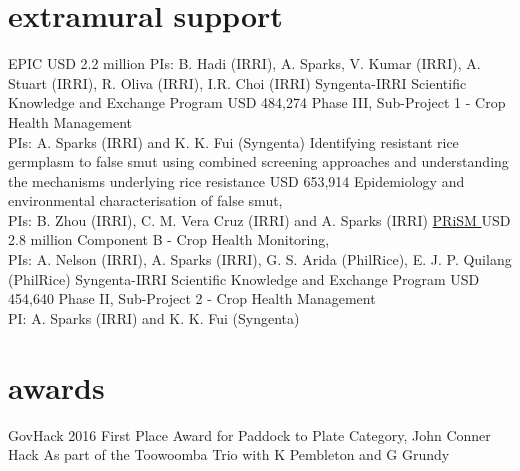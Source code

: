 \section*{extramural support}
  \begin{entrylist}
  {EPIC }
  {USD 2.2 million}
  {PIs: B. Hadi (IRRI), A. Sparks, V. Kumar (IRRI), A. Stuart (IRRI), R. Oliva (IRRI), I.R. Choi (IRRI)}
	 {Syngenta-IRRI Scientific Knowledge and Exchange Program}
	 {USD 484,274}
	 {Phase III, Sub-Project 1 - Crop Health Management\\PIs: A. Sparks (IRRI) and K. K. Fui (Syngenta)}
   {Identifying resistant rice germplasm to false smut using combined screening approaches and understanding the mechanisms underlying rice resistance}
   {USD 653,914}
   {Epidemiology and environmental characterisation of false smut,\\PIs: B. Zhou (IRRI), C. M. {Vera Cruz} (IRRI) and A. Sparks (IRRI)}
	 {\href{http://philippinericeinfo.ph/}{PRiSM }}
	 {USD 2.8 million}
	 {Component B - Crop Health Monitoring,\\PIs: A. Nelson (IRRI), A. Sparks (IRRI), G. S. Arida (PhilRice), E. J. P. Quilang (PhilRice)}
	  {Syngenta-IRRI Scientific Knowledge and Exchange Program}
	  {USD 454,640}
	  {Phase II, Sub-Project 2 - Crop Health Management\\PI: A. Sparks (IRRI) and K. K. Fui (Syngenta)}
  \end{entrylist}

  \section*{awards}
    \begin{entrylist}
    {GovHack 2016 First Place Award for Paddock to Plate Category, John Conner Hack}
    {}
    {As part of the Toowoomba Trio with K Pembleton and G Grundy}      \end{entrylist}

